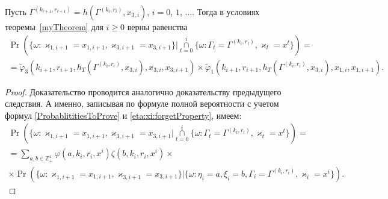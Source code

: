 \documentclass[a4paper,12pt,russian]{extarticle}
\begin{document}
\begin{corollary}
Пусть $\Gamma^{(k_{i+1},r_{i+1})}=h(\Gamma^{(k_i,r_i)},x_{3,i})$, $i=0$, $1$, $\ldots$. Тогда в условиях теоремы~\ref{myTheorem} для $i \geqslant 0$ верны равенства
\begin{multline}
\Pr (\{ \omega \colon \varkappa_{1,i+1} = x_{1,i+1}, \varkappa_{3,i+1} = x_{3,i+1}\} |\mathop{\cap}\limits_{t=0}^{i}\{\omega\colon \Gamma_t=\Gamma^{(k_t,r_t)}, \varkappa_t=x^t\})=\\
=\widetilde{\varphi}_3(k_{i+1},r_{i+1},h_T(\Gamma^{(k_i,r_i)},x_{3,i}),x_{3,i},x_{3,i+1}) \times \widetilde{\varphi}_1(k_{i+1},r_{i+1},h_T(\Gamma^{(k_i,r_i)},x_{3,i}),x_{1,i},x_{1,i+1}).
\label{kappa:1:kappa:3:conditional}
\end{multline}
\end{corollary}
\begin{proof}
Доказательство проводится аналогично доказательству предыдущего следствия. А именно, записывая по формуле полной вероятности с учетом формул \eqref{ProbablititiesToProve} и \eqref{eta:xi:forgetProperty}, имеем:
\begin{multline*}
\Pr (\{ \omega \colon \varkappa_{1,i+1} = x_{1,i+1}, \varkappa_{3,i+1} = x_{3,i+1} |\mathop{\cap}\limits_{t=0}^{i}\{\omega\colon \Gamma_t=\Gamma^{(k_t,r_t)}, \varkappa_t=x^t\}) =\\
=\sum_{a,b\in \mathbb{Z}_+^4} \varphi(a,k_i,r_i,x^i)\zeta(b,k_i,r_i,x^i) \times\\
\times \Pr (\{ \omega \colon \varkappa_{1,i+1} = x_{1,i+1}, \varkappa_{3,i+1} = x_{3,i+1}\} |\{\omega\colon \eta_i=a, \xi_i=b, \Gamma_i=\Gamma^{(k_i,r_i)}, \varkappa_i=x^i\}).
\end{multline*}



\end{proof}
\end{document}
